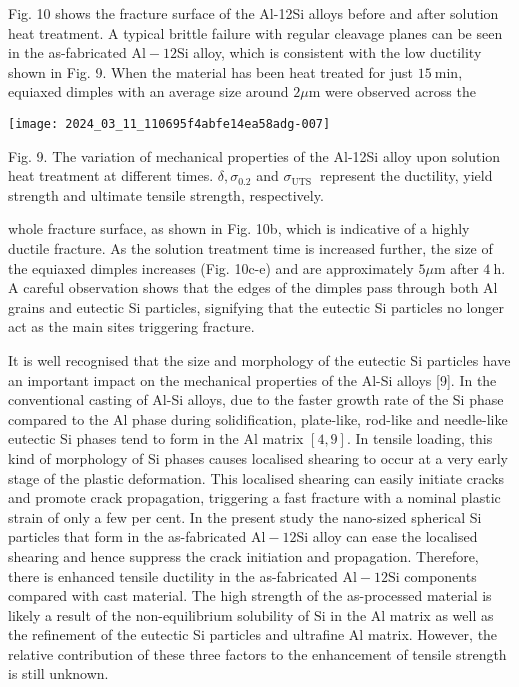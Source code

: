 \documentclass[10pt]{article}
\begin{document}
Fig. 10 shows the fracture surface of the Al-12Si alloys before and after solution heat treatment. A typical brittle failure with regular cleavage planes can be seen in the as-fabricated $\mathrm{Al}-12 \mathrm{Si}$ alloy, which is consistent with the low ductility shown in Fig. 9. When the material has been heat treated for just $15 \mathrm{~min}$, equiaxed dimples with an average size around $2 \mu \mathrm{m}$ were observed across the

\begin{center}
\texttt{[image: 2024\_03\_11\_110695f4abfe14ea58adg-007]}
\end{center}

Fig. 9. The variation of mechanical properties of the Al-12Si alloy upon solution heat treatment at different times. $\delta, \sigma_{0.2}$ and $\sigma_{\text {UTS }}$ represent the ductility, yield strength and ultimate tensile strength, respectively.

whole fracture surface, as shown in Fig. 10b, which is indicative of a highly ductile fracture. As the solution treatment time is increased further, the size of the equiaxed dimples increases (Fig. 10c-e) and are approximately $5 \mu \mathrm{m}$ after $4 \mathrm{~h}$. A careful observation shows that the edges of the dimples pass through both $\mathrm{Al}$ grains and eutectic Si particles, signifying that the eutectic Si particles no longer act as the main sites triggering fracture.

It is well recognised that the size and morphology of the eutectic Si particles have an important impact on the mechanical properties of the Al-Si alloys [9]. In the conventional casting of Al-Si alloys, due to the faster growth rate of the Si phase compared to the $\mathrm{Al}$ phase during solidification, plate-like, rod-like and needle-like eutectic Si phases tend to form in the Al matrix $[4,9]$. In tensile loading, this kind of morphology of Si phases causes localised shearing to occur at a very early stage of the plastic deformation. This localised shearing can easily initiate cracks and promote crack propagation, triggering a fast fracture with a nominal plastic strain of only a few per cent. In the present study the nano-sized spherical Si particles that form in the as-fabricated $\mathrm{Al}-12 \mathrm{Si}$ alloy can ease the localised shearing and hence suppress the crack initiation and propagation. Therefore, there is enhanced tensile ductility in the as-fabricated $\mathrm{Al}-12 \mathrm{Si}$ components compared with cast material. The high strength of the as-processed material is likely a result of the non-equilibrium solubility of $\mathrm{Si}$ in the $\mathrm{Al}$ matrix as well as the refinement of the eutectic Si particles and ultrafine Al matrix. However, the relative contribution of these three factors to the enhancement of tensile strength is still unknown.
\end{document}
